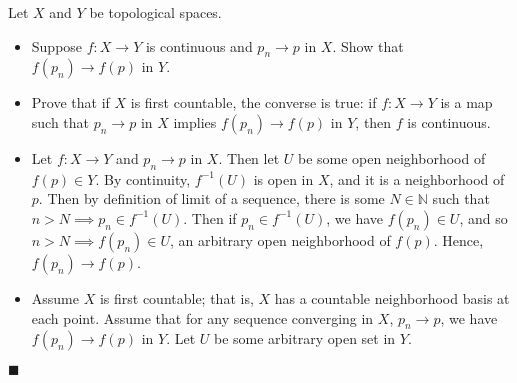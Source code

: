 \documentclass[12pt]{article}
\renewcommand{\qed}{\hfill$\blacksquare$}
\renewenvironment{proof}{\begin{addmargin}[1em]{0em}\begin{newproof}}{\end{newproof}\end{addmargin}\qed}
\newenvironment{problem}[2][Problem]{\begin{trivlist}
\item[\hskip \labelsep {\bfseries #1}\hskip \labelsep {\bfseries #2.}]}{\end{trivlist}}
\begin{document}
\begin{problem}{2-15}
Let $X$ and $Y$ be topological spaces.
\begin{itemize}
	\item Suppose $f:X\rightarrow Y$ is continuous and $p_n\rightarrow p$ in $X$. Show that $f\left(p_n\right)\rightarrow f\left(p\right)$ in $Y$.
	\item Prove that if $X$ is first countable, the converse is true: if $f:X\rightarrow Y$ is a map such that $p_n\rightarrow p$ in $X$ implies $f\left(p_n\right)\rightarrow f\left(p\right)$ in $Y$, then $f$ is continuous.
\end{itemize}
\end{problem}
\begin{proof}
\begin{itemize}
	\item Let $f:X\rightarrow Y$ and $p_n\rightarrow p$ in $X$. Then let $U$ be some open neighborhood of $f\left(p\right) \in Y$. By continuity, $f^{-1}\left(U\right)$ is open in $X$, and it is a neighborhood of $p$. Then by definition of limit of a sequence, there is some $N \in \mathbb{N}$ such that $n>N \implies p_n \in f^{-1}\left(U\right)$. Then if $p_n \in f^{-1}\left(U\right)$, we have $f\left(p_n\right)\in U$, and so $n>N \implies f\left(p_n\right)\in U$, an arbitrary open neighborhood of $f\left(p\right)$. Hence, $f\left(p_n\right)\rightarrow f\left(p\right)$.
	\item Assume $X$ is first countable; that is, $X$ has a countable neighborhood basis at each point. Assume that for any sequence converging in $X$, $p_n \rightarrow p$, we have $f\left(p_n\right)\rightarrow f\left(p\right)$ in $Y$. Let $U$ be some arbitrary open set in $Y$.
\end{itemize}
\end{proof}
\end{document}
